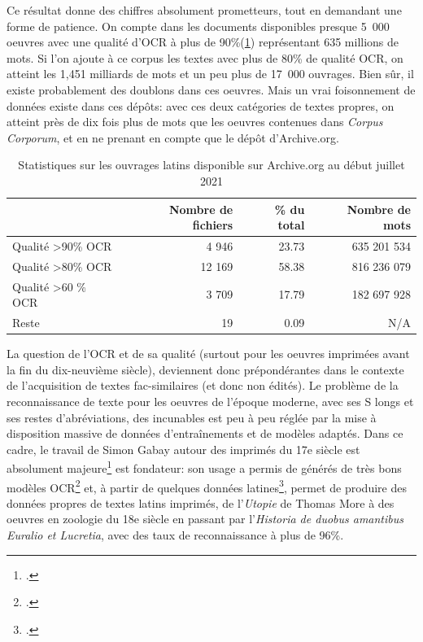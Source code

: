 Ce résultat donne des chiffres absolument prometteurs, tout en demandant une forme de patience. On compte dans les documents disponibles presque 5~000 oeuvres avec une qualité d'OCR à plus de 90\%(\ref{tab:chap1:latin-OCR}) représentant 635 millions de mots. Si l'on ajoute à ce corpus les textes avec plus de 80\% de qualité OCR, on atteint les 1,451 milliards de mots et un peu plus de 17~000 ouvrages. Bien sûr, il existe probablement des doublons dans ces oeuvres. Mais un vrai foisonnement de données existe dans ces dépôts: avec ces deux catégories de textes propres, on atteint près de dix fois plus de mots que les oeuvres contenues dans \textit{Corpus Corporum}, et en ne prenant en compte que le dépôt d'Archive.org.

\begin{table}[ht]
\centering
\begin{tabular}{l|rrr}
\toprule
                               & Nombre de fichiers & \% du total & Nombre de mots \\ \midrule
Qualité \textgreater 90\% OCR  & 4 946              & 23.73       & 635 201 534    \\
Qualité \textgreater 80\% OCR  & 12 169             & 58.38       & 816 236 079      \\
Qualité \textgreater 60 \% OCR & 3 709              & 17.79       & 182 697 928      \\
Reste                          & 19                 & 0.09        & N/A           \\ \bottomrule
\end{tabular}
\caption{Statistiques sur les ouvrages latins disponible sur Archive.org au début juillet 2021}
\label{tab:chap1:latin-OCR}
\end{table}

La question de l'OCR et de sa qualité (surtout pour les oeuvres imprimées avant la fin du dix-neuvième siècle), deviennent donc prépondérantes dans le contexte de l'acquisition de textes fac-similaires (et donc non édités). Le problème de la reconnaissance de texte pour les oeuvres de l'époque moderne, avec ses S longs et ses restes d'abréviations, des incunables est peu à peu réglée par la mise à disposition massive de données d'entraînements et de modèles adaptés. Dans ce cadre, le travail de Simon Gabay autour des imprimés du 17e siècle est absolument majeure\footcite{simon_gabay_2020_3826894} est fondateur: son usage a permis de générés de très bons modèles OCR\footcite{gabay:hal-02577236} et, à partir de quelques données latines\footcite{Clerice_CREMMA_16_18_Prints_2021}, permet de produire des données propres de textes latins imprimés, de l'\textit{Utopie} de Thomas More à des oeuvres en zoologie du 18e siècle en passant par l'\textit{Historia de duobus amantibus Euralio et Lucretia}, avec des taux de reconnaissance à plus de 96\%. 

